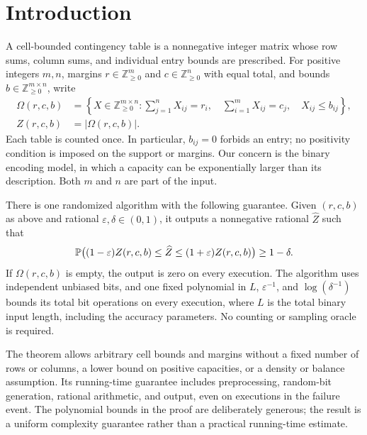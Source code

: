 \section{Introduction}\label{sec:introduction}
A cell-bounded contingency table is a nonnegative integer matrix whose
row sums, column sums, and individual entry bounds are prescribed.
For positive integers $m,n$, margins
$r\in\mathbb Z_{\ge0}^m$ and $c\in\mathbb Z_{\ge0}^n$ with equal total,
and bounds $b\in\mathbb Z_{\ge0}^{m\times n}$, write
\begin{equation}\label{eq:feasible-set}
\begin{aligned}
 \Omega(r,c,b)&=\left\{X\in\mathbb Z_{\ge0}^{m\times n}:
 \sum_{j=1}^n X_{ij}=r_i,\quad
 \sum_{i=1}^m X_{ij}=c_j,\quad X_{ij}\le b_{ij}\right\},\\
 Z(r,c,b)&=|\Omega(r,c,b)|.
\end{aligned}
\end{equation}
Each table is counted once. In particular, $b_{ij}=0$ forbids an entry;
no positivity condition is imposed on the support or margins.
Our concern is the binary encoding model, in which a capacity can be
exponentially larger than its description. Both $m$ and $n$ are part of
the input.

\begin{theorem}\label{thm:main}
There is one randomized algorithm with the following guarantee. Given
$(r,c,b)$ as above and rational $\varepsilon,\delta\in(0,1)$, it outputs
a nonnegative rational $\widehat Z$ such that
\[
 \P\bigl((1-\varepsilon)Z(r,c,b)\le \widehat Z
                  \le(1+\varepsilon)Z(r,c,b)\bigr)\ge1-\delta.
\]
If $\Omega(r,c,b)$ is empty, the output is zero on every execution.
The algorithm uses independent unbiased bits, and one fixed polynomial
in $L$, $\varepsilon^{-1}$, and $\log(\delta^{-1})$ bounds its total bit
operations on every execution, where $L$ is the total binary input
length, including the accuracy parameters. No counting or sampling
oracle is required.
\end{theorem}

The theorem allows arbitrary cell bounds and margins without a fixed
number of rows or columns, a lower bound on positive capacities, or a
density or balance assumption. Its running-time guarantee includes
preprocessing, random-bit generation, rational arithmetic, and output,
even on executions in the failure event. The polynomial bounds in the
proof are deliberately generous; the result is a uniform complexity
guarantee rather than a practical running-time estimate.

